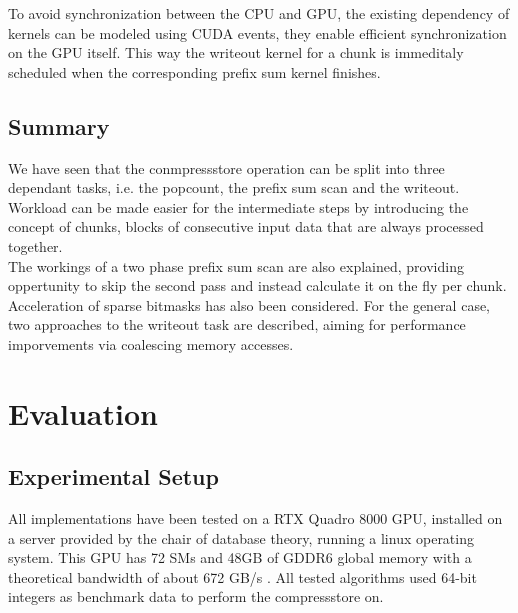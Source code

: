 \documentclass{tudscrreprt}
\begin{document}
			To avoid synchronization between the CPU and GPU, the existing dependency of kernels can be modeled using CUDA events, they enable efficient synchronization on the GPU itself. This way the writeout kernel for a chunk is immeditaly scheduled when the corresponding prefix sum kernel finishes. \\
		
		\section{Summary}
			We have seen that the conmpressstore operation can be split into three dependant tasks, i.e. the popcount, the prefix sum scan and the writeout. Workload can be made easier for the intermediate steps by introducing the concept of chunks, blocks of consecutive input data that are always processed together. \\
			The workings of a two phase prefix sum scan are also explained, providing oppertunity to skip the second pass and instead calculate it on the fly per chunk. \\
			Acceleration of sparse bitmasks has also been considered. For the general case, two approaches to the writeout task are described, aiming for performance imporvements via coalescing memory accesses. \\
		
	\chapter{Evaluation}
	
		\section{Experimental Setup}
			All implementations have been tested on a RTX Quadro 8000 GPU, installed on a server provided by the chair of database theory, running a linux operating system. This GPU has 72 SMs and 48GB of GDDR6 global memory with a theoretical bandwidth of about 672 GB/s \cite{quadrortx8000_specs}. All tested algorithms used 64-bit integers as benchmark data to perform the compressstore on. \\
			
\end{document}

